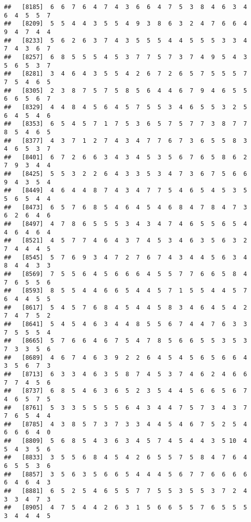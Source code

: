 \documentclass[
]{book}
\begin{document}
\begin{verbatim}
##   [8185]  6  6  7  6  4  7  4  3  6  6  4  7  5  3  8  4  6  3  4  6  4  5  5  7
##   [8209]  5  5  4  4  3  5  5  4  9  3  8  6  3  2  4  7  6  6  4  9  4  7  4  4
##   [8233]  5  6  2  6  3  7  4  3  5  5  5  4  4  5  5  5  3  3  4  7  4  3  6  7
##   [8257]  6  8  5  5  5  4  5  3  7  7  5  7  3  7  4  9  5  4  3  5  6  5  3  7
##   [8281]  3  4  6  4  3  5  5  4  2  6  7  2  6  5  7  5  5  5  7  7  5  4  6  5
##   [8305]  2  3  8  7  5  7  5  8  5  6  4  4  6  7  9  4  6  5  5  6  6  5  6  7
##   [8329]  4  4  8  4  5  6  4  5  7  5  5  3  4  6  5  5  3  2  5  6  4  5  4  6
##   [8353]  6  5  4  5  7  1  7  5  3  6  5  7  5  7  7  3  8  7  7  8  5  4  6  5
##   [8377]  4  3  7  1  2  7  4  3  4  7  7  6  7  3  6  5  5  8  3  4  6  5  3  7
##   [8401]  6  7  2  6  6  3  4  3  4  5  3  5  6  7  6  5  8  6  2  7  9  3  4  4
##   [8425]  5  5  3  2  2  6  4  3  3  5  3  4  7  3  6  7  5  6  6  9  4  3  5  4
##   [8449]  4  6  4  4  8  7  4  3  4  7  7  5  4  6  5  4  5  3  5  5  6  5  4  4
##   [8473]  6  5  7  6  8  5  4  6  4  5  4  6  8  4  7  8  4  7  3  6  2  6  4  6
##   [8497]  4  7  8  6  5  5  5  3  4  3  4  7  4  6  5  5  6  5  4  4  6  4  6  4
##   [8521]  4  5  7  7  4  6  4  3  7  4  5  3  4  6  3  5  6  3  2  7  4  4  4  5
##   [8545]  5  7  6  9  3  4  7  2  7  6  7  4  3  4  4  5  6  3  4  8  4  4  3  3
##   [8569]  7  5  5  6  4  5  6  6  6  4  5  5  7  7  6  6  5  8  4  7  6  5  5  6
##   [8593]  8  5  5  4  4  6  6  5  4  4  5  7  1  5  5  4  4  5  7  6  4  4  5  5
##   [8617]  5  4  5  7  6  8  4  5  4  4  5  8  3  4  6  4  5  4  2  7  4  7  5  2
##   [8641]  5  4  5  4  6  3  4  4  8  5  5  6  7  4  4  7  6  3  3  7  5  5  5  4
##   [8665]  5  7  6  6  4  6  7  5  4  7  8  5  6  6  5  5  3  5  3  7  3  3  5  6
##   [8689]  4  6  7  4  6  3  9  2  2  6  4  5  4  5  6  5  6  6  4  3  5  6  7  3
##   [8713]  6  3  3  4  6  3  5  8  7  4  5  3  7  4  6  2  4  6  6  7  7  4  5  6
##   [8737]  6  8  5  4  6  3  6  5  2  3  5  4  4  5  6  6  5  6  7  4  6  5  7  5
##   [8761]  5  3  3  5  5  5  5  6  4  3  4  4  7  5  7  3  4  3  7  7  6  5  4  4
##   [8785]  4  3  8  5  7  3  7  3  3  4  4  5  4  6  7  5  2  5  4  6  6  6  4  0
##   [8809]  5  6  8  5  4  3  6  3  4  5  7  4  5  4  4  3  5 10  4  5  4  3  5  6
##   [8833]  3  5  5  6  8  4  5  4  2  6  5  5  7  5  8  4  7  6  4  6  5  5  3  6
##   [8857]  3  5  6  3  5  6  6  5  4  4  4  5  6  7  7  6  6  6  6  6  4  6  4  3
##   [8881]  6  5  2  5  4  6  5  5  7  7  5  5  3  5  5  3  7  2  4  3  3  4  7  3
##   [8905]  4  7  5  4  4  2  6  3  1  5  6  6  5  5  7  6  5  5  5  3  4  4  4  5

\end{verbatim}
\end{document}

